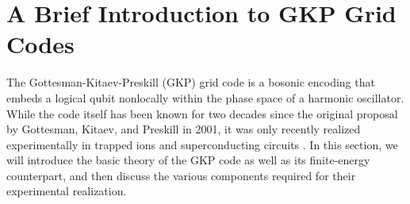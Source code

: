 

\section{A Brief Introduction to GKP Grid Codes\label{sec:2_Intro_to_GKP}}

The Gottesman-Kitaev-Preskill (GKP) grid code is a bosonic encoding that embeds a logical qubit nonlocally within the phase space of a harmonic oscillator. While the code itself has been known for two decades since the original proposal by Gottesman, Kitaev, and Preskill \cite{gottesman2001gkp} in 2001, it was only recently realized experimentally in trapped ions \cite{fluhmann2019gkp-expt, deneeve2022gkp-expt} and superconducting circuits \cite{campagne2020gkp-expt, sivak2023gkp-expt, nordquantique2023gkp-expt}. In this section, we will introduce the basic theory of the GKP code as well as its finite-energy counterpart, and then discuss the various components required for their experimental realization. 

